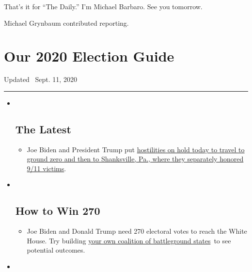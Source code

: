 That's it for ``The Daily.'' I'm Michael Barbaro. See you tomorrow.

Michael Grynbaum contributed reporting.

\hypertarget{our-2020-election-guide}{%
\section{Our 2020 Election Guide}\label{our-2020-election-guide}}

Updated ~Sept. 11, 2020

\begin{center}\rule{0.5\linewidth}{\linethickness}\end{center}

\begin{itemize}
\item ~
  \hypertarget{the-latest}{%
  \subsection{The Latest}\label{the-latest}}

  \begin{itemize}
  \item
    Joe Biden and President Trump put
    \href{https://www.nytimes3xbfgragh.onion/2020/09/11/us/politics/shanksville-trump-biden.html?action=click\&pgtype=Article\&state=default\&region=BELOW_MAIN_CONTENT\&context=storylines_guide}{hostilities
    on hold today to travel to ground zero and then to Shanksville, Pa.,
    where they separately honored 9/11 victims}.
  \end{itemize}
\item ~
  \hypertarget{how-to-win-270}{%
  \subsection{How to Win 270}\label{how-to-win-270}}

  \begin{itemize}
  \item
    Joe Biden and Donald Trump need 270 electoral votes to reach the
    White House. Try building
    \href{https://www.nytimes3xbfgragh.onion/interactive/2020/us/elections/election-states-biden-trump.html?action=click\&pgtype=Article\&state=default\&region=BELOW_MAIN_CONTENT\&context=storylines_guide}{your
    own coalition of battleground states}~to see potential outcomes.
  \end{itemize}
\item ~
  \hypertarget{voting-by-mail}{%
}
\end{itemize}
